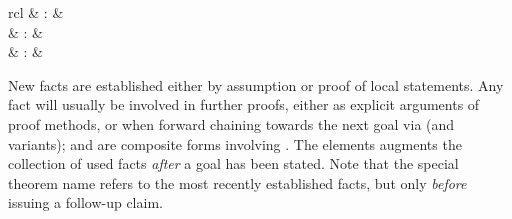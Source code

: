 \begin{isabellebody}
\begin{isamarkuptext}
\begin{matharray}{rcl}
    \hypertarget{command.with}{\hyperlink{command.with}{\mbox{}}} & : &  \\
    \hypertarget{command.using}{\hyperlink{command.using}{\mbox{}}} & : &  \\
    \hypertarget{command.unfolding}{\hyperlink{command.unfolding}{\mbox{}}} & : &  \\
  \end{matharray}

  New facts are established either by assumption or proof of local
  statements.  Any fact will usually be involved in further proofs,
  either as explicit arguments of proof methods, or when forward
  chaining towards the next goal via \hyperlink{command.then}{\mbox{}} (and variants);
  \hyperlink{command.from}{\mbox{}} and \hyperlink{command.with}{\mbox{}} are composite forms
  involving \hyperlink{command.note}{\mbox{}}.  The \hyperlink{command.using}{\mbox{}} elements
  augments the collection of used facts \emph{after} a goal has been
  stated.  Note that the special theorem name \hyperlink{fact.this}{\mbox{}} refers
  to the most recently established facts, but only \emph{before}
  issuing a follow-up claim.


\end{isamarkuptext}
\end{isabellebody}

